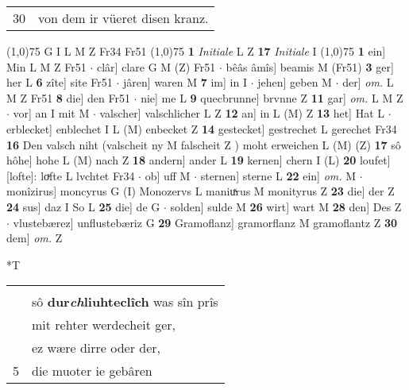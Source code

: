 \documentclass[8pt,a4paper,notitlepage]{article}
\begin{document}
\begin{table}[ht]
\begin{minipage}[t]{0.5\linewidth}
\begin{tabular}{rl}
30 & von dem ir vüeret disen kranz.\\ 
\end{tabular}
\scriptsize
\line(1,0){75} \newline
G I L M Z Fr34 Fr51 \newline
\line(1,0){75} \newline
\textbf{1} \textit{Initiale} L Z  \textbf{17} \textit{Initiale} I  \newline
\line(1,0){75} \newline
\textbf{1} ein] Min L M Z Fr51  $\cdot$ clâr] clare G M (Z) Fr51  $\cdot$ bêâs âmîs] beamis M (Fr51) \textbf{3} ger] her L \textbf{6} zîte] site Fr51  $\cdot$ jâren] waren M \textbf{7} im] in I  $\cdot$ jehen] geben M  $\cdot$ der] \textit{om.} L M Z Fr51 \textbf{8} die] den Fr51  $\cdot$ nie] me L \textbf{9} quecbrunne] brvnne Z \textbf{11} gar] \textit{om.} L M Z  $\cdot$ vor] an I mit M  $\cdot$ valscher] valschlicher L Z \textbf{12} an] in L (M) Z \textbf{13} het] Hat L  $\cdot$ erblecket] enblechet I L (M) enbecket Z \textbf{14} gestecket] gestrechet L gerechet Fr34 \textbf{16} Den valsch niht (valscheit ny M falscheit Z ) moht erweichen L (M) (Z) \textbf{17} sô hôhe] hohe L (M) nach Z \textbf{18} andern] ander L \textbf{19} kernen] chern I (L) \textbf{20} loufet] [lofte]: loͮfte L lvchtet Fr34  $\cdot$ ob] uff M  $\cdot$ sternen] sterne L \textbf{22} ein] \textit{om.} M  $\cdot$ monîzirus] moncyrus G (I) Monozervs L maniuͯrus M monityrus Z \textbf{23} die] der Z \textbf{24} sus] daz I So L \textbf{25} die] de G  $\cdot$ solden] sulde M \textbf{26} wirt] wart M \textbf{28} den] Des Z  $\cdot$ vlustebærez] unflustebæriz G \textbf{29} Gramoflanz] gramorflanz M gramoflantz Z \textbf{30} dem] \textit{om.} Z \newline
\end{minipage}
\hspace{0.5cm}
\begin{minipage}[t]{0.5\linewidth}
\small
\begin{center}*T
\end{center}
\begin{tabular}{rl}
 & \textbf{\begin{large}M\end{large}în} clâre, süeze bêâs âmîs,\\ 
 & sô \textbf{dur\textit{ch}liuhteclîch} was sîn prîs\\ 
 & mit rehter werdecheit ger,\\ 
 & ez wære dirre oder der,\\ 
5 & die muoter ie gebâren\\ 

\end{tabular}
\end{minipage}
\end{table}
\end{document}
